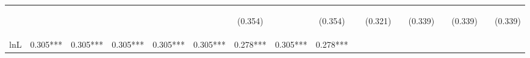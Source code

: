 \begin{center}
\begin{tabular}{lcccccccccccccccc}
\vspace{4pt} & \begin{footnotesize}\end{footnotesize} & \begin{footnotesize}\end{footnotesize} & \begin{footnotesize}\end{footnotesize} & \begin{footnotesize}\end{footnotesize} & \begin{footnotesize}\end{footnotesize} & \begin{footnotesize}(0.354)\end{footnotesize} & \begin{footnotesize}\end{footnotesize} & \begin{footnotesize}(0.354)\end{footnotesize} & \begin{footnotesize}\end{footnotesize} & \begin{footnotesize}(0.321)\end{footnotesize} & \begin{footnotesize}\end{footnotesize} & \begin{footnotesize}(0.339)\end{footnotesize} & \begin{footnotesize}\end{footnotesize} & \begin{footnotesize}(0.339)\end{footnotesize} & \begin{footnotesize}\end{footnotesize} & \begin{footnotesize}(0.339)\end{footnotesize} \\
lnL & 0.305*** & 0.305*** & 0.305*** & 0.305*** & 0.305*** & 0.278*** & 0.305*** & 0.278*** &  &  &  &  &  &  &  &  \\

\end{tabular}
\end{center}
